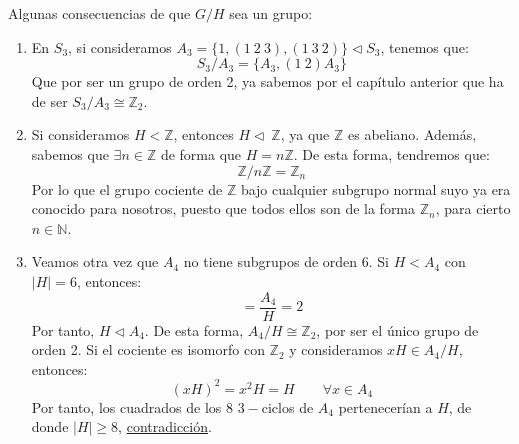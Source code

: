 \begin{ejemplo}
    Algunas consecuencias de que $G/H$ sea un grupo:
    \begin{enumerate}
        \item En $S_3$, si consideramos $A_3 = \{1, (1\ 2\ 3), (1\ 3\ 2)\} \lhd S_3$, tenemos que:
            \begin{equation*}
                S_3/A_3 = \{A_3, (1\ 2)A_3\} 
            \end{equation*}
            Que por ser un grupo de orden 2, ya sabemos por el capítulo anterior que ha de ser $S_3/A_3\cong\mathbb{Z}_2$.
        \item Si consideramos $H<\mathbb{Z}$, entonces $H\lhd\ \mathbb{Z}$, ya que $\mathbb{Z}$ es abeliano. Además, sabemos que $\exists n\in \mathbb{Z}$ de forma que $H = n\mathbb{Z}$. De esta forma, tendremos que:
            \begin{equation*}
                \mathbb{Z}/n\mathbb{Z} = \mathbb{Z}_n
            \end{equation*}
            Por lo que el grupo cociente de $\mathbb{Z}$ bajo cualquier subgrupo normal suyo ya era conocido para nosotros, puesto que todos ellos son de la forma $\mathbb{Z}_n$, para cierto $n\in \mathbb{N}$.
        \item Veamos otra vez que $A_4$ no tiene subgrupos de orden 6. Si $H<A_4$ con $|H| = 6$, entonces:
            \begin{equation*}
                [A_4:H] = \dfrac{A_4}{H} = 2
            \end{equation*}
            Por tanto, $H\lhd A_4$. De esta forma, $A_4/H\cong \mathbb{Z}_2$, por ser el único grupo de orden 2. Si el cociente es isomorfo con $\mathbb{Z}_2$ y consideramos $xH\in A_4/H$, entonces:
            \begin{equation*}
                {(xH)}^{2} = x^2H = H \qquad \forall x\in A_4
            \end{equation*}
            Por tanto, los cuadrados de los 8 $3-$ciclos de $A_4$ pertenecerían a $H$, de donde $|H| \geq 8$, \underline{contradicción}.
    \end{enumerate}
\end{ejemplo}

